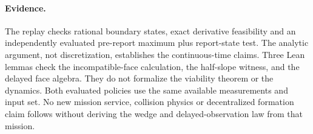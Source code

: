 \documentclass[11pt]{article}
\begin{document}
\paragraph{Evidence.}
The replay checks rational boundary states, exact derivative feasibility and an independently evaluated pre-report maximum plus report-state test. The analytic argument, not discretization, establishes the continuous-time claims. Three Lean lemmas check the incompatible-face calculation, the half-slope witness, and the delayed face algebra. They do not formalize the viability theorem or the dynamics. Both evaluated policies use the same available measurements and input set. No new mission service, collision physics or decentralized formation claim follows without deriving the wedge and delayed-observation law from that mission.
\end{document}
